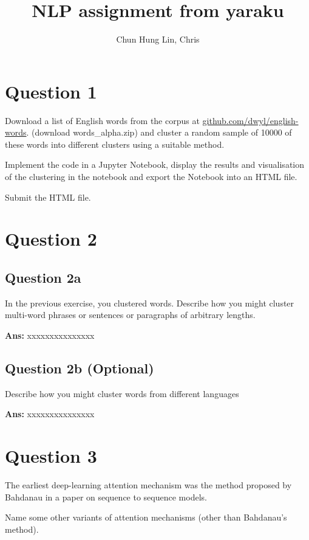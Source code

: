 \documentclass{kthreport}
\title{NLP assignment from yaraku}
\author{Chun Hung Lin, Chris}
\begin{document}
\maketitle


\section{Question 1}

Download a list of English words from the corpus at \hspace{0.1em}
\href{https://github.com/dwyl/english-words}{github.com/dwyl/english-words}.
(download words\_alpha.zip) and cluster a random sample of 10000 of
these words into different clusters using a suitable method.

Implement the code in a Jupyter Notebook, display the results and visualisation
of the clustering in the notebook and export the Notebook into an HTML file.

Submit the HTML file.

\section{Question 2}
\subsection{Question 2a}
In the previous exercise, you clustered words. 
Describe how you might cluster multi-word phrases or sentences or paragraphs of 
arbitrary lengths.

\textbf{Ans:}
xxxxxxxxxxxxxxx

\subsection{Question 2b (Optional)}
Describe how you might cluster words from different languages

\textbf{Ans:}
xxxxxxxxxxxxxxx
\section{Question 3}
The earliest deep-learning attention mechanism was the method proposed by Bahdanau
in a paper on sequence to sequence models. 
 
Name some other variants of attention mechanisms (other than Bahdanau's method).
\end{document}
